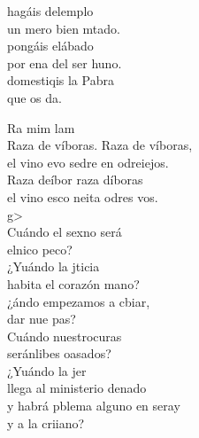 \begin{cancion}%
	 hagáis delemplo\\
	un mero bien mtado.\\
	 pongáis elábado\\
	por ena del ser huno.\\
	 domestiqis la Pabra \\
	que os da.\jump\\
	\begin{chorus}%
	        Ra     mim       lam\\
	Raza de víboras. Raza de víboras,\\
		el vino evo sedre en odreiejos.\\
		Raza deíbor raza díboras\\
		el vino esco neita odres vos.\\
		g>  \\
		Cuándo el sexno será\\
		elnico peco?\\
		¿Yuándo la jticia \\
		habita el corazón mano?\\
		¿ándo empezamos a cbiar,\\
		dar nue pas?\\
	\jump
		Cuándo nuestrocuras\\
		seránlibes oasados?\\
		¿Yuándo la jer \\
		llega al ministerio denado\\
		y  habrá pblema alguno en seray\\
		y a la  criiano?\jump\\
	\begin{chorus}%

\end{chorus}
\end{chorus}
\end{cancion}

